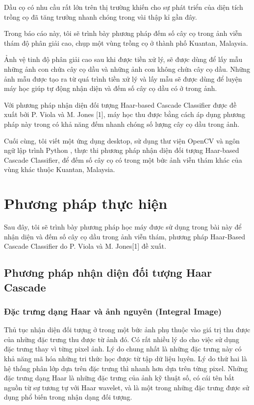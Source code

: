\documentclass[14pt, oneside, a4paper, openany]{scrartcl}
\begin{document}
Dầu cọ có nhu cầu rất lớn trên thị trường khiến cho sự phát triển của diện tích trồng cọ đã tăng trưởng nhanh chóng trong vài thập kỉ gần đây.

Trong báo cáo này, tôi sẽ trình bày phương pháp đếm số cây cọ trong ảnh viễn thám độ phân giải cao, chụp một vùng trồng cọ ở thành phố Kuantan, Malaysia. 

Ảnh vệ tinh độ phân giải cao sau khi được tiền xử lý, sẽ được dùng để lấy mẫu những ảnh con chứa cây cọ dầu và những ảnh con không chứa cây cọ dầu. Những ảnh mẫu được tạo ra từ quá trình tiền xử lý và lấy mẫu sẽ được dùng để luyện máy học giúp tự động nhận diện và đếm số cây cọ dầu có ở trong ảnh.

Với phương pháp nhận diện đối tượng Haar-based Cascade Classifier được đề xuất bởi P. Viola và M. Jones [1], máy học thu được bằng cách áp dụng phương pháp này trong có khả năng đếm nhanh chóng số lượng cây cọ dầu trong ảnh.

Cuối cùng, tôi viết một ứng dụng desktop, sử dụng thư viện OpenCV\cite{opencv} và ngôn ngữ lập trình Python \cite{python}, thực thi phương pháp nhận diện đối tượng Haar-based Cascade Classifier, để đếm số cây cọ có trong một bức ảnh viễn thám khác của vùng khác thuộc Kuantan, Malaysia.

\newpage
\section{Phương pháp thực hiện}
Sau đây, tôi sẽ trình bày phương pháp học máy được sử dụng trong bài này để nhận diện và đếm số cây cọ dầu trong ảnh viễn thám, phương pháp Haar-Based Cascade Classifier do  P. Viola và M. Jones[1] đề xuất.
\subsection{Phương pháp nhận diện đối tượng Haar Cascade}
\subsubsection{Đặc trưng dạng Haar và ảnh nguyên (Integral Image)}
Thủ tục nhận diện đối tượng ở trong một bức ảnh phụ thuộc vào giá trị thu được của những đặc trưng thu được từ ảnh đó. Có rất nhiều lý do cho việc sử dụng đặc trưng thay vì từng pixel ảnh. Lý do chung nhất là những đặc trưng này có khả năng mã hóa những tri thức học được từ tập dữ liệu luyên. Lý do thứ hai là hệ thống phân lớp dựa trên đặc trưng thì nhanh hơn dựa trên từng pixel.
Những đặc trưng dạng Haar là những đặc trưng của ảnh kỹ thuật số, có cái tên bắt nguồn từ sự tương tự với Haar wavelet, và là một trong những đặc trưng được sử dụng phổ biến trong nhận dạng đối tượng.
\end{document}
